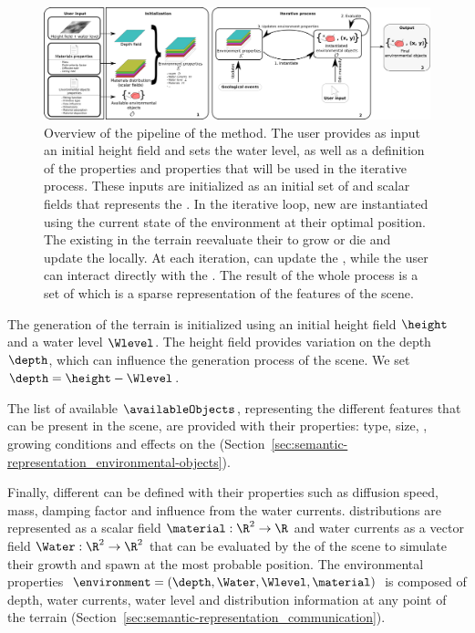 \begin{figure}
    \includegraphics{Figures/pipeline.pdf}
    \caption{Overview of the pipeline of the method. The user provides as input an initial height field and sets the water level, as well as a definition of the  properties and  properties that will be used in the iterative process. These inputs are initialized as an initial set of  and scalar fields that represents the . In the iterative loop, new  are instantiated using the current state of the environment at their optimal position. The existing  in the terrain reevaluate their  to grow or die and update the  locally. At each iteration,  can update the , while the user can interact directly with the . The result of the whole process is a set of  which is a sparse representation of the features of the scene. }
    \label{fig:semantic-representation_pipeline}
\end{figure}

The generation of the terrain is initialized using an initial height field $\height$ and a water level $\Wlevel$. The height field provides variation on the depth $\depth$, which can influence the generation process of the scene. We set $\depth = \height - \Wlevel$.

The list of available  $\availableObjects$, representing the different features that can be present in the scene, are provided with their properties: type, size, , growing conditions and effects on the  (Section~\ref{sec:semantic-representation_environmental-objects}).

Finally, different  can be defined with their properties such as diffusion speed, mass, damping factor and influence from the water currents.  distributions are represented as a scalar field $\material: \R^2 \to \R$ and water currents as a vector field $\Water: \R^2 \to \R^2$ that can be evaluated by the  of the scene to simulate their growth and spawn at the most probable position. The environmental properties $\environment = (\depth, \Water, \Wlevel, \material)$ is composed of depth, water currents, water level and  distribution information at any point of the terrain (Section~\ref{sec:semantic-representation_communication}).

